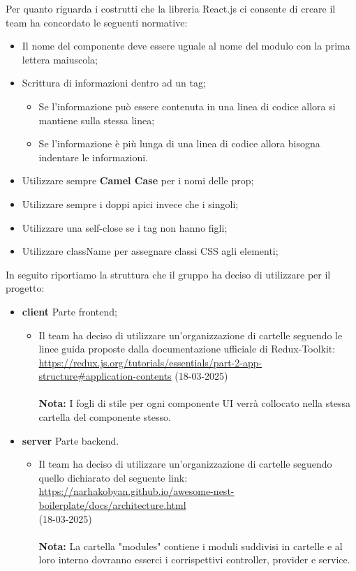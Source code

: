 Per quanto riguarda i costrutti che la libreria React.js ci consente di creare il team ha concordato le seguenti normative:
\begin{itemize}
    \item Il nome del componente deve essere uguale al nome del modulo con la prima lettera maiuscola;
    \item Scrittura di informazioni dentro ad un tag;
    \begin{itemize}
        \item Se l’informazione può essere contenuta in una linea di codice allora si mantiene sulla stessa
        linea;
        \item Se l’informazione è più lunga di una linea di codice allora bisogna indentare le informazioni.
    \end{itemize}
    \item Utilizzare sempre \textbf{Camel Case} per i nomi delle prop;
    \item Utilizzare sempre i doppi apici invece che i singoli;
    \item Utilizzare una self-close se i tag non hanno figli;
    \item Utilizzare className per assegnare classi CSS agli elementi;
\end{itemize}


In seguito riportiamo la struttura che il gruppo ha deciso di utilizzare per il progetto:
\begin{itemize}
    \item \textbf{client} Parte frontend;
    \begin{itemize}
        \item Il team ha deciso di utilizzare un'organizzazione di cartelle seguendo le linee guida proposte dalla documentazione ufficiale di Redux-Toolkit:\\
        \url{https://redux.js.org/tutorials/essentials/part-2-app-structure#application-contents} (18-03-2025)\\ \\
        \textbf{Nota:} I fogli di stile per ogni componente UI verrà collocato nella stessa cartella del componente stesso.
    \end{itemize}

    \item \textbf{server} Parte backend.
    \begin{itemize}
        \item Il team ha deciso di utilizzare un'organizzazione di cartelle seguendo quello dichiarato del seguente link:\\
        \url{https://narhakobyan.github.io/awesome-nest-boilerplate/docs/architecture.html}\\ (18-03-2025) \\ \\
        \textbf{Nota:} La cartella "modules" contiene i moduli suddivisi in cartelle e al loro interno dovranno esserci i corrispettivi controller, provider e service.
    \end{itemize}
\end{itemize}


